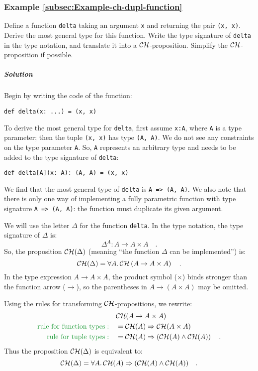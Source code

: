 \subsubsection{Example \label{subsec:Example-ch-dupl-function}\ref{subsec:Example-ch-dupl-function}}

Define a function \lstinline!delta! taking an argument \lstinline!x!
and returning the pair \lstinline!(x, x)!. Derive the most general
type for this function. Write the type signature of \lstinline!delta!
in the type notation, and translate it into a ${\cal CH}$-proposition.
Simplify the ${\cal CH}$-proposition if possible.

\subparagraph{Solution}

Begin by writing the code of the function:
\begin{lstlisting}
def delta(x: ...) = (x, x)
\end{lstlisting}
To derive the most general type for \lstinline!delta!, first assume
\lstinline!x:A!, where \lstinline!A! is a type parameter; then the
tuple \lstinline!(x, x)! has type \lstinline!(A, A)!. We do not
see any constraints on the type parameter \lstinline!A!. So, \lstinline!A!
represents an arbitrary type and needs to be added to the type signature
of \lstinline!delta!:
\begin{lstlisting}
def delta[A](x: A): (A, A) = (x, x)
\end{lstlisting}
We find that the most general type of \lstinline!delta! is \lstinline!A => (A, A)!.
We also note that there is only one way of implementing a fully parametric
function with type signature \lstinline!A => (A, A)!: the function
must duplicate its given argument.

We will use the letter $\Delta$ for the function \lstinline!delta!.
In the type notation, the type signature of $\Delta$ is:
\[
\Delta^{A}:A\rightarrow A\times A\quad.
\]
So, the proposition ${\cal CH}(\Delta)$ (meaning \textsf{``}the function
$\Delta$ can be implemented\textsf{''}) is:
\[
{\cal CH}(\Delta)=\forall A.{\cal \,CH}\left(A\rightarrow A\times A\right)\quad.
\]
In the type expression $A\rightarrow A\times A$, the product symbol
($\times$) binds stronger than the function arrow ($\rightarrow$),
so the parentheses in $A\rightarrow\left(A\times A\right)$ may be
omitted.

Using the rules for transforming ${\cal CH}$-propositions, we rewrite:
\begin{align*}
 & {\cal CH}(A\rightarrow A\times A)\\
{\color{greenunder}\text{rule for function types}:}\quad & ={\cal CH}(A)\Rightarrow{\cal CH}(A\times A)\\
{\color{greenunder}\text{rule for tuple types}:}\quad & ={\cal CH}(A)\Rightarrow\left({\cal CH}(A)\wedge{\cal CH}(A)\right)\quad.
\end{align*}
Thus the proposition ${\cal CH}(\Delta)$ is equivalent to:
\[
{\cal CH}(\Delta)=\forall A.\,{\cal CH}(A)\Rightarrow({\cal CH}(A)\wedge{\cal CH}(A))\quad.
\]


